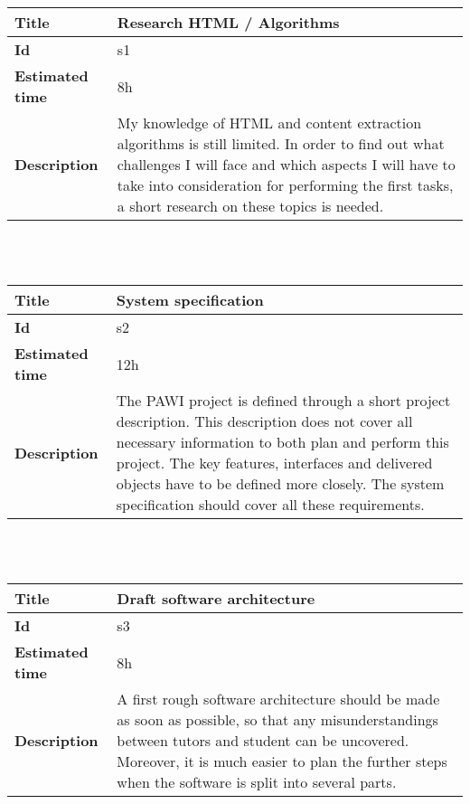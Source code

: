     \begin{tabular}{ | p{4cm} | p{10cm} |}
    \hline
    \textbf{Title} & Research HTML / Algorithms\\ \hline
    \textbf{Id} & s1\\ \hline
    \textbf{Estimated time} & 8h \\ \hline
    \textbf{Description} & My knowledge of HTML and content extraction algorithms is still limited. In order to find out what challenges I will face and which aspects I will have to take into consideration for performing the first tasks, a short research on these topics is needed.\\
    \hline
    \end{tabular} \\\\


    \begin{tabular}{ | p{4cm} | p{10cm} |}
    \hline
    \textbf{Title} & System specification\\ \hline
    \textbf{Id} & s2\\ \hline
    \textbf{Estimated time} & 12h \\ \hline
    \textbf{Description} & The PAWI project is defined through a short project description. This description does not cover all necessary information to both plan and perform this project. The key features, interfaces and delivered objects have to be defined more closely. The system specification should cover all these requirements.\\
    \hline
    \end{tabular} \\\\


    \begin{tabular}{ | p{4cm} | p{10cm} |}
    \hline
    \textbf{Title} & Draft software architecture\\ \hline
    \textbf{Id} & s3\\ \hline
    \textbf{Estimated time} & 8h \\ \hline
    \textbf{Description} & A first rough software architecture should be made as soon as possible, so that any misunderstandings between tutors and student can be uncovered. Moreover, it is much easier to plan the further steps when the software is split into several parts.\\
    \hline
    \end{tabular} \\\\


